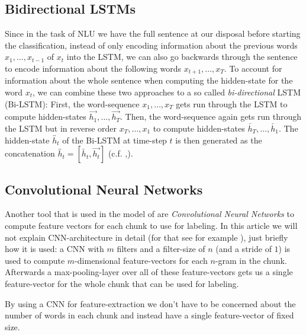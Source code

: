\documentclass[twoside,11pt,a4paper]{article}
\theoremstyle{break}
\begin{document}
\subsection{Bidirectional LSTMs}
Since in the task of NLU we have the full sentence at our disposal before starting the classification, instead of only encoding information about the previous words $x_1, \dots, x_{t-1}$ of $x_t$ into the LSTM, we can also go backwards through the sentence to encode information about the following words $x_{t+1}, \dots, x_T$. To account for information about the whole sentence when computing the hidden-state for the word $x_t$, we can combine these two approaches to a so called \textit{bi-directional} LSTM (Bi-LSTM): First, the word-sequence $x_1, \dots, x_T$ gets run through the LSTM to compute hidden-states $\overrightarrow{h_1}, \dots, \overrightarrow{h_T}$. Then, the word-sequence again gets run through the LSTM but in reverse order $x_T, \dots, x_1$ to compute hidden-states $\overleftarrow{h_T}, \dots, \overleftarrow{h_1}$. The hidden-state $\overleftrightarrow{h_t}$ of the Bi-LSTM at time-step $t$ is then generated as the concatenation $\overleftrightarrow{h_t} = [\overleftarrow{h_t}, \overrightarrow{h_t}]$ (c.f. \cite{yang:2016},\cite{zhai:2017}).

\subsection{Convolutional Neural Networks}
Another tool that is used in the model of \cite{zhai:2017} are \textit{Convolutional Neural Networks}  to compute feature vectors for each chunk to use for labeling. In this article we will not explain CNN-architecture in detail (for that see for example \cite{kim:2014}), just briefly how it is used: a CNN with $m$ filters and a filter-size of $n$ (and a stride of $1$) is used to compute $m$-dimensional feature-vectors for each $n$-gram in the chunk. Afterwards a max-pooling-layer over all of these feature-vectors gets us a single feature-vector for the whole chunk that can be used for labeling.\par
By using a CNN for feature-extraction we don't have to be concerned about the number of words in each chunk and instead have a single feature-vector of fixed size.
\end{document}
